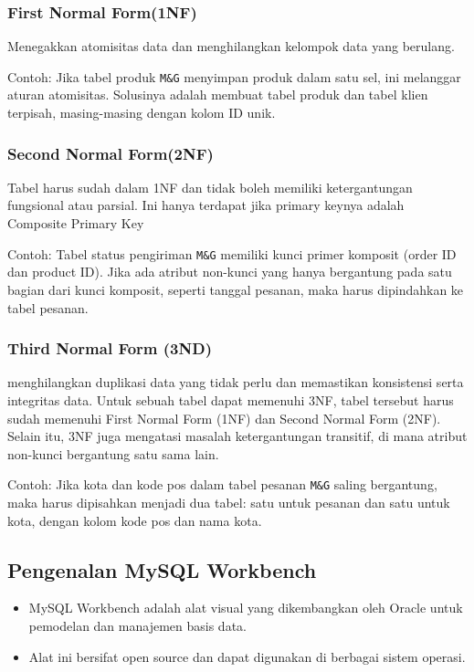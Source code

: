 \documentclass{article}
\begin{document}
\subsubsection{First Normal Form(1NF)}
Menegakkan atomisitas data dan menghilangkan kelompok data yang berulang.

Contoh: Jika tabel produk \verb|M&G| menyimpan produk dalam satu sel, ini melanggar aturan atomisitas. Solusinya adalah membuat tabel produk dan tabel klien terpisah, masing-masing dengan kolom ID unik.

\subsubsection{Second Normal Form(2NF)}
Tabel harus sudah dalam 1NF dan tidak boleh memiliki ketergantungan fungsional atau parsial. Ini hanya terdapat jika primary keynya adalah Composite Primary Key

Contoh: Tabel status pengiriman \verb|M&G| memiliki kunci primer komposit (order ID dan product ID). Jika ada atribut non-kunci yang hanya bergantung pada satu bagian dari kunci komposit, seperti tanggal pesanan, maka harus dipindahkan ke tabel pesanan.

\subsubsection{Third Normal Form (3ND)}
menghilangkan duplikasi data yang tidak perlu dan memastikan konsistensi serta integritas data. Untuk sebuah tabel dapat memenuhi 3NF, tabel tersebut harus sudah memenuhi First Normal Form (1NF) dan Second Normal Form (2NF). Selain itu, 3NF juga mengatasi masalah ketergantungan transitif, di mana atribut non-kunci bergantung satu sama lain.

Contoh: Jika kota dan kode pos dalam tabel pesanan \verb|M&G| saling bergantung, maka harus dipisahkan menjadi dua tabel: satu untuk pesanan dan satu untuk kota, dengan kolom kode pos dan nama kota.

\subsection{Pengenalan MySQL Workbench}
\begin{itemize}
    \item MySQL Workbench adalah alat visual yang dikembangkan oleh Oracle untuk pemodelan dan manajemen basis data.
    \item Alat ini bersifat open source dan dapat digunakan di berbagai sistem operasi.
\end{itemize}
\end{document}
